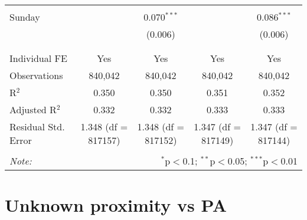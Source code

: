 \documentclass[
]{article}
\begin{document}
\begin{table}[!htbp]
{\begin{tabular}{@{\extracolsep{5pt}}lcccc}
  & & & & \\ 
 Sunday &  & 0.070$^{***}$ &  & 0.086$^{***}$ \\ 
  &  & (0.006) &  & (0.006) \\ 
  & & & & \\ 
\hline \\[-1.8ex] 
Individual FE & Yes & Yes & Yes & Yes \\ 
Observations & 840,042 & 840,042 & 840,042 & 840,042 \\ 
R$^{2}$ & 0.350 & 0.350 & 0.351 & 0.352 \\ 
Adjusted R$^{2}$ & 0.332 & 0.332 & 0.333 & 0.333 \\ 
Residual Std. Error & 1.348 (df = 817157) & 1.348 (df = 817152) & 1.347 (df = 817149) & 1.347 (df = 817144) \\ 
\hline 
\hline \\[-1.8ex] 
\textit{Note:}  & \multicolumn{4}{r}{$^{*}$p$<$0.1; $^{**}$p$<$0.05; $^{***}$p$<$0.01} \\ 
\end{tabular}
} 
\end{table} 
\newpage
\section{Unknown proximity vs PA}
\end{document}
